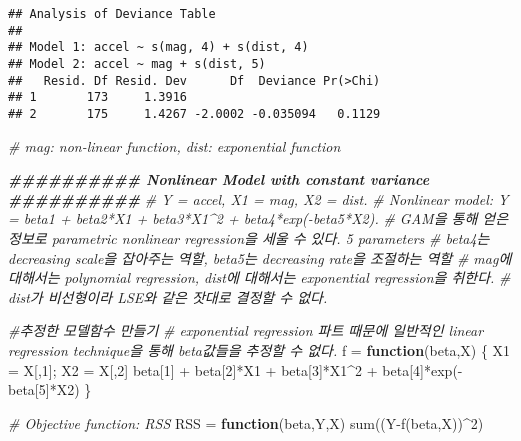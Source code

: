 \documentclass[
]{article}
\newenvironment{Shaded}{\begin{snugshade}}{\end{snugshade}}
\newcommand{\CommentTok}[1]{\textcolor[rgb]{0.56,0.35,0.01}{\textit{#1}}}
\newcommand{\ControlFlowTok}[1]{\textcolor[rgb]{0.13,0.29,0.53}{\textbf{#1}}}
\newcommand{\DecValTok}[1]{\textcolor[rgb]{0.00,0.00,0.81}{#1}}
\newcommand{\DocumentationTok}[1]{\textcolor[rgb]{0.56,0.35,0.01}{\textbf{\textit{#1}}}}
\newcommand{\FunctionTok}[1]{\textcolor[rgb]{0.00,0.00,0.00}{#1}}
\newcommand{\NormalTok}[1]{#1}
\newcommand{\OtherTok}[1]{\textcolor[rgb]{0.56,0.35,0.01}{#1}}
\newcommand{\SpecialCharTok}[1]{\textcolor[rgb]{0.00,0.00,0.00}{#1}}
\begin{document}
\begin{verbatim}
## Analysis of Deviance Table
## 
## Model 1: accel ~ s(mag, 4) + s(dist, 4)
## Model 2: accel ~ mag + s(dist, 5)
##   Resid. Df Resid. Dev      Df  Deviance Pr(>Chi)
## 1       173     1.3916                           
## 2       175     1.4267 -2.0002 -0.035094   0.1129
\end{verbatim}

\begin{Shaded}
\begin{Highlighting}[]
\CommentTok{\# mag: non{-}linear function, dist: exponential function}

\DocumentationTok{\#\#\#\#\#\#\#\#\#\# Nonlinear Model with constant variance \#\#\#\#\#\#\#\#\#\#}
\CommentTok{\# Y = accel, X1 = mag, X2 = dist.}
\CommentTok{\# Nonlinear model: Y = beta1 + beta2*X1 + beta3*X1\^{}2 + beta4*exp({-}beta5*X2).}
\CommentTok{\# GAM을 통해 얻은 정보로 parametric nonlinear regression을 세울 수 있다. 5 parameters}
\CommentTok{\# beta4는 decreasing scale을 잡아주는 역할, beta5는 decreasing rate을 조절하는 역할}
\CommentTok{\# mag에 대해서는 polynomial regression, dist에 대해서는 exponential regression을 취한다. }
\CommentTok{\# dist가 비선형이라 LSE와 같은 잣대로 결정할 수 없다. }

\CommentTok{\#추정한 모델함수 만들기 }
\CommentTok{\# exponential regression 파트 때문에 일반적인 linear regression technique을 통해 beta값들을 추정할 수 없다. }
\NormalTok{f }\OtherTok{=} \ControlFlowTok{function}\NormalTok{(beta,X)}
\NormalTok{\{}
\NormalTok{  X1 }\OtherTok{=}\NormalTok{ X[,}\DecValTok{1}\NormalTok{]; X2 }\OtherTok{=}\NormalTok{ X[,}\DecValTok{2}\NormalTok{]  }
\NormalTok{  beta[}\DecValTok{1}\NormalTok{] }\SpecialCharTok{+}\NormalTok{ beta[}\DecValTok{2}\NormalTok{]}\SpecialCharTok{*}\NormalTok{X1 }\SpecialCharTok{+}\NormalTok{ beta[}\DecValTok{3}\NormalTok{]}\SpecialCharTok{*}\NormalTok{X1}\SpecialCharTok{\^{}}\DecValTok{2} \SpecialCharTok{+}\NormalTok{ beta[}\DecValTok{4}\NormalTok{]}\SpecialCharTok{*}\FunctionTok{exp}\NormalTok{(}\SpecialCharTok{{-}}\NormalTok{beta[}\DecValTok{5}\NormalTok{]}\SpecialCharTok{*}\NormalTok{X2)}
\NormalTok{\}}

\CommentTok{\# Objective function: RSS}
\NormalTok{RSS }\OtherTok{=} \ControlFlowTok{function}\NormalTok{(beta,Y,X) }\FunctionTok{sum}\NormalTok{((Y}\SpecialCharTok{{-}}\FunctionTok{f}\NormalTok{(beta,X))}\SpecialCharTok{\^{}}\DecValTok{2}\NormalTok{)}


\end{Highlighting}
\end{Shaded}
\end{document}
